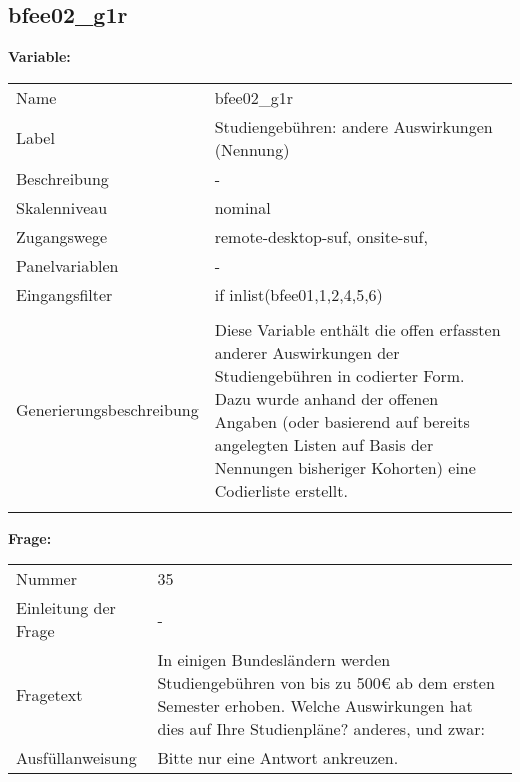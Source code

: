 	
	
	\subsection{bfee02\_g1r}
	\label{subSection:bfee02_g1r}

	\noindent\textbf{Variable:}\\
		\begin{tabular}{lL{11.3cm}}
			\label{tableVariable:bfee02_g1r}
			Name & bfee02\_g1r \\
			Label & Studiengebühren: andere Auswirkungen (Nennung) \\
			Beschreibung & - \\
			Skalenniveau & nominal \\
			Zugangswege &
				remote-desktop-suf,
				onsite-suf,
 \\
			Panelvariablen & -
			 \\
			Eingangsfilter & if inlist(bfee01,1,2,4,5,6) \\
 \\
					Generierungsbeschreibung & Diese Variable enthält die offen erfassten anderer Auswirkungen der Studiengebühren in codierter Form. Dazu wurde anhand der offenen Angaben (oder basierend auf bereits angelegten Listen auf Basis der Nennungen bisheriger Kohorten) eine Codierliste erstellt.
				 \\	
			 \\
		\end{tabular}

		\vspace*{1 cm}
		\noindent\textbf{Frage:}\\
		\begin{tabular}{lL{11.3cm}}
			\label{tableQuestion:bfee02_g1r}
			Nummer & 35 \\
			Einleitung der Frage & - \\
			Fragetext & In einigen Bundesländern werden Studiengebühren von bis zu 500€ ab dem ersten Semester erhoben. Welche Auswirkungen hat dies auf Ihre Studienpläne?
anderes, und zwar: \\
			Ausfüllanweisung & Bitte nur eine Antwort ankreuzen. \\
		\end{tabular}





